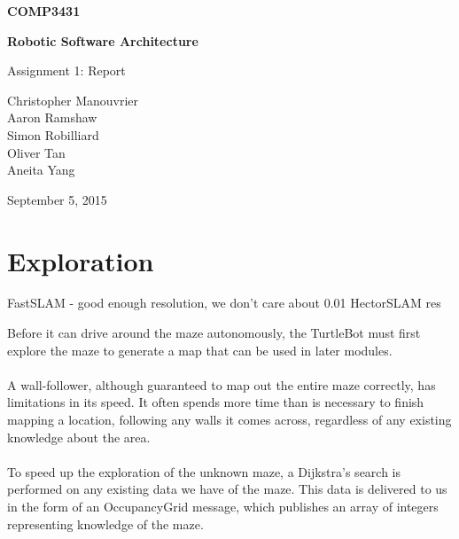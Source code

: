 \documentclass[titlepage,12pt,a4paper]{article}
\begin{document}
\begin{titlepage}
    \begin{center}
        \vspace*{3cm}
        
        \Huge
        \textbf{COMP3431\\}
        \title{}
        \vspace{0.5cm}
        \Huge
        \textbf{Robotic Software Architecture}
        
        \vspace{0.54cm}
        
        \Large
        Assignment 1: Report
        
        \vspace{5cm}

	\normalsize
	Christopher Manouvrier\\
	Aaron Ramshaw\\
	Simon Robilliard\\
	Oliver Tan\\
	Aneita Yang
        
	\vfill
        
        \Large
        September 5, 2015
        
    \end{center}
\end{titlepage}

\pagebreak

\section*{Exploration}

FastSLAM - good enough resolution, we don't care about 0.01 HectorSLAM res

Before it can drive around the maze autonomously, the TurtleBot must first explore the maze to generate a map that can be used in later modules. \\
\\
A wall-follower, although guaranteed to map out the entire maze correctly, has limitations in its speed. It often spends more time than is necessary to finish mapping a location, following any walls it comes across, regardless of any existing knowledge about the area.\\
\\
To speed up the exploration of the unknown maze, a Dijkstra's search is performed on any existing data we have of the maze. This data is delivered to us in the form of an OccupancyGrid message, which publishes an array of integers representing knowledge of the maze.
\end{document}
